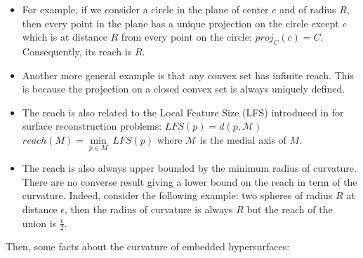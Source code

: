 \begin{itemize}
    \item For example, if we consider a circle in the plane of center $ c $ and
        of radius $ R $, then every point in the plane has a unique projection on
        the circle except $ c $ which is at distance $ R $ from every point on the
        circle: $ proj_C(c) = C $. Consequently, its reach is $ R $.

    \item Another more general example is that any convex set has infinite
        reach. This is because the projection on a closed convex set is always
        uniquely defined.

    \item The reach is also related to the Local Feature Size (LFS) introduced
        in \cite{amenta1999surface} for surface reconstruction problems: $
        LFS(p) = d(p, \mathcal{M}) $ $ reach(M) = \min\limits_{p \in M}~LFS(p) $
        where $ \mathcal{M}  $ is the medial axis of $ M $.

    \item The reach is also always upper bounded by the minimum radius of
        curvature. There are no converse result giving a lower bound on the
        reach in term of the curvature. Indeed, consider the
        following example: two spheres of radius $ R $ at distance $ \epsilon $,
        then the radius of curvature is always $ R $ but the reach of the union
        is $ \frac{\epsilon}{2} $.
\end{itemize}

Then, some facts about the curvature of embedded hypersurfaces:

